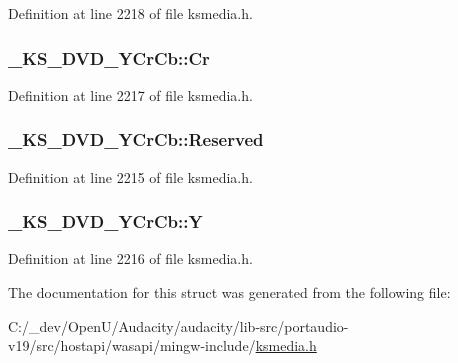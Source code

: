 Definition at line 2218 of file ksmedia.\+h.

\subsubsection[{\texorpdfstring{Cr}{Cr}}]{ \+\_\+\+K\+S\+\_\+\+D\+V\+D\+\_\+\+Y\+Cr\+Cb\+::\+Cr}\hypertarget{struct___k_s___d_v_d___y_cr_cb_a1d59e1937f9cacc994dba2ac7a723e4d}{}\label{struct___k_s___d_v_d___y_cr_cb_a1d59e1937f9cacc994dba2ac7a723e4d}


Definition at line 2217 of file ksmedia.\+h.

\subsubsection[{\texorpdfstring{Reserved}{Reserved}}]{ \+\_\+\+K\+S\+\_\+\+D\+V\+D\+\_\+\+Y\+Cr\+Cb\+::\+Reserved}\hypertarget{struct___k_s___d_v_d___y_cr_cb_a228e6ac3afd000efa9f9b85a582b2d26}{}\label{struct___k_s___d_v_d___y_cr_cb_a228e6ac3afd000efa9f9b85a582b2d26}


Definition at line 2215 of file ksmedia.\+h.

\subsubsection[{\texorpdfstring{Y}{Y}}]{ \+\_\+\+K\+S\+\_\+\+D\+V\+D\+\_\+\+Y\+Cr\+Cb\+::Y}\hypertarget{struct___k_s___d_v_d___y_cr_cb_a7196b0909215130d963bb5009ead7291}{}\label{struct___k_s___d_v_d___y_cr_cb_a7196b0909215130d963bb5009ead7291}


Definition at line 2216 of file ksmedia.\+h.



The documentation for this struct was generated from the following file\+:\begin{DoxyCompactItemize}
\item 
C\+:/\+\_\+dev/\+Open\+U/\+Audacity/audacity/lib-\/src/portaudio-\/v19/src/hostapi/wasapi/mingw-\/include/\hyperlink{ksmedia_8h}{ksmedia.\+h}\end{DoxyCompactItemize}
